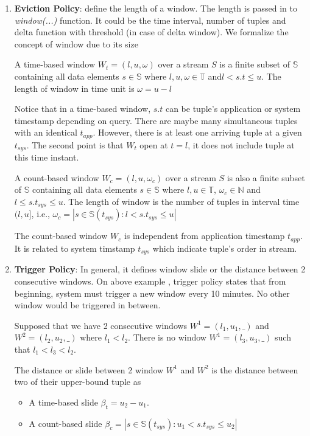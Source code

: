 \begin{enumerate}

\item \textbf{Eviction Policy}: define the length of a window. The length is passed in to \textit{window(...)} function. It could be the time interval, number of tuples and delta function with threshold (in case of delta window).
We formalize the concept of window due to its size

\begin{defi}
A time-based window $W_{t} = (l,u,\omega)$ over a stream $S$ is a finite subset of  $\mathbb{S}$ containing all data elements $s \in \mathbb{S}$ where $l , u, \omega \in \mathbb{T}$ and$l < s.t \leq u$. The length of window in time unit is $\omega = u-l$
\end{defi}
Notice that in a time-based window, $s.t$ can be tuple's application or system timestamp depending on query. There are maybe many simultaneous tuples with an identical $t_{app}$. However, there is at least one arriving tuple at a given $t_{sys}$. The second point is that $W_t$ open at $t = l$, it does not include tuple at this time instant.

\begin{defi}
A count-based window $W_{c} = (l,u,\omega_c)$ over a stream $S$ is also a finite subset of  $\mathbb{S}$ containing all data elements $s \in \mathbb{S}$ where $l,u \in \mathbb{T}$, $\omega_c \in \mathbb{N}$ and $l \leq s.t_{sys} \leq u$. The length of window is the number of tuples in interval time $(l, u]$, i.e., $\omega_c = | {s \in \mathbb{S}(t_{sys}): l < s.t_{sys} \leq u}|$
\end{defi}
The count-based window $W_{c}$ is independent from application timestamp $t_{app}$. It is related to system timstamp $t_{sys}$ which indicate tuple's order in stream. 


\item \textbf{Trigger Policy}: In general, it defines window slide or the distance between 2 consecutive windows. On above example , trigger policy states that from beginning, system must trigger a new window every 10 minutes. No other window would be triggered in between.

Supposed that we have 2 consecutive windows $W^1 = (l_1, u_1, \_)$ and $W^2 = (l_2, u_2, \_)$  where $l_1 < l_2$. There is no window $W^1 = (l_3, u_3, \_)$ such that $l_1< l_3 < l_2$.
\begin{defi}
The distance or slide between 2 window $W^1$ and $W^2$ is the distance between two of their upper-bound tuple as
\begin{itemize}


\item  A time-based slide $\beta_{t} = u_2 - u_1$.  
\item A count-based slide $\beta_{c} = |{s \in \mathbb{S}(t_{sys}): u_1 < s.t_{sys} \leq u_2}| $ 

\end{itemize}

\end{defi}

\end{enumerate}

